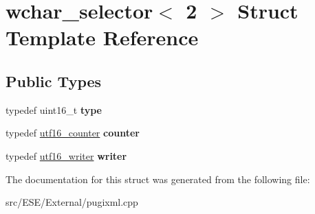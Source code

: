 \hypertarget{structwchar__selector_3_012_01_4}{\section{wchar\-\_\-selector$<$ 2 $>$ Struct Template Reference}
\label{structwchar__selector_3_012_01_4}
}
\subsection*{Public Types}
\begin{DoxyCompactItemize}
\item 
\hypertarget{structwchar__selector_3_012_01_4_a60517f9b159ad60977ca7c3d2739c168}{typedef uint16\-\_\-t {\bfseries type}}\label{structwchar__selector_3_012_01_4_a60517f9b159ad60977ca7c3d2739c168}

\item 
\hypertarget{structwchar__selector_3_012_01_4_a108682c81b16127f3bec2501f02cb9d8}{typedef \hyperlink{structutf16__counter}{utf16\-\_\-counter} {\bfseries counter}}\label{structwchar__selector_3_012_01_4_a108682c81b16127f3bec2501f02cb9d8}

\item 
\hypertarget{structwchar__selector_3_012_01_4_af84979f9b8cd883798fe4e99820d6073}{typedef \hyperlink{structutf16__writer}{utf16\-\_\-writer} {\bfseries writer}}\label{structwchar__selector_3_012_01_4_af84979f9b8cd883798fe4e99820d6073}

\end{DoxyCompactItemize}


The documentation for this struct was generated from the following file\-:\begin{DoxyCompactItemize}
\item 
src/\-E\-S\-E/\-External/pugixml.\-cpp\end{DoxyCompactItemize}
